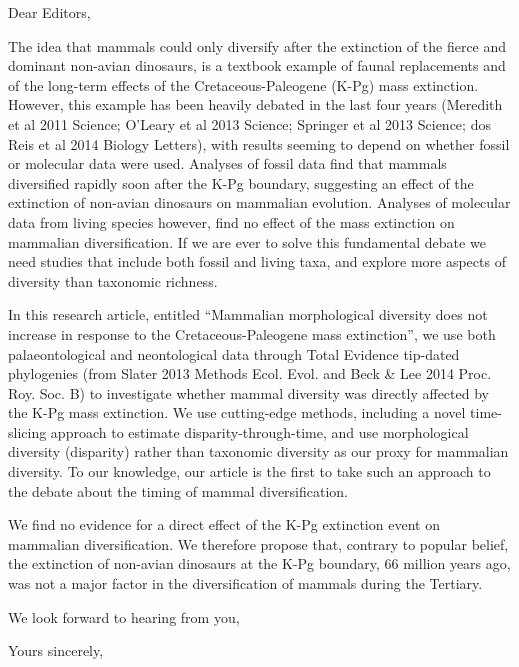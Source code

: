 \documentclass[11pt]{letter}
\begin{document}
\begin{letter}{}
\opening{Dear Editors,}

The idea that mammals could only diversify after the extinction of the fierce and dominant non-avian dinosaurs, is a textbook example of faunal replacements and of the long-term effects of the Cretaceous-Paleogene (K-Pg) mass extinction.
However, this example has been heavily debated in the last four years (Meredith et al 2011 Science; O'Leary et al 2013 Science; Springer et al 2013 Science; dos Reis et al 2014 Biology Letters), with results seeming to depend on whether fossil or molecular data were used. 
Analyses of fossil data find that mammals diversified rapidly soon after the K-Pg boundary, suggesting an effect of the extinction of non-avian dinosaurs on mammalian evolution. 
Analyses of molecular data from living species however, find no effect of the mass extinction on mammalian diversification. 
If we are ever to solve this fundamental debate we need studies that include both fossil and living taxa, and explore more aspects of diversity than taxonomic richness.

In this research article, entitled ``Mammalian morphological diversity does not increase in response to the Cretaceous-Paleogene mass extinction'', we use both palaeontological and neontological data through Total Evidence tip-dated phylogenies (from Slater 2013 Methods Ecol. Evol. and Beck \& Lee 2014 Proc. Roy. Soc. B) to investigate whether mammal diversity was directly affected by the K-Pg mass extinction. We use cutting-edge methods, including a novel time-slicing approach to estimate disparity-through-time, and use morphological diversity (disparity) rather than taxonomic diversity as our proxy for mammalian diversity.
To our knowledge, our article is the first to take such an approach to the debate about the timing of mammal diversification.

We find no evidence for a direct effect of the K-Pg extinction event on mammalian diversification.
We therefore propose that, contrary to popular belief, the extinction of non-avian dinosaurs at the K-Pg boundary, 66 million years ago, was not a major factor in the diversification of mammals during the Tertiary. 

We look forward to hearing from you,

\closing{Yours sincerely,}

\end{letter}
\end{document}

